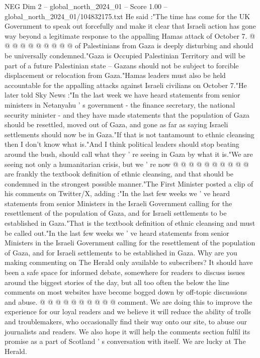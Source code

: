\begin{textsample}{NEG Dim 2 – global\_north\_2024\_01 – Score 1.00 – global\_north\_2024\_01/104832175.txt}
He said :"The time has come for the UK Government to speak out forcefully and make it clear that Israeli action has gone way beyond a legitimate response to the appalling Hamas attack of October 7. @ @ @ @ @ @ @ @ @ @ of Palestinians from Gaza is deeply disturbing and should be universally condemned."Gaza is Occupied Palestinian Territory and will be part of a future Palestinian state -- Gazans should not be subject to forcible displacement or relocation from Gaza."Hamas leaders must also be held accountable for the appalling attacks against Israeli civilians on October 7."He later told Sky News :"In the last week we have heard statements from senior ministers in Netanyahu ' s government - the finance secretary, the national security minister - and they have made statements that the population of Gaza should be resettled, moved out of Gaza, and gone as far as saying Israeli settlements should now be in Gaza."If that is not tantamount to ethnic cleansing then I don't know what is."And I think political leaders should stop beating around the bush, should call what they ' re seeing in Gaza by what it is."We are seeing not only a humanitarian crisis, but we ' re now @ @ @ @ @ @ @ @ @ @ are frankly the textbook definition of ethnic cleansing, and that should be condemned in the strongest possible manner."The First Minister posted a clip of his comments on Twitter/X, adding :"In the last few weeks we ' ve heard statements from senior Ministers in the Israeli Government calling for the resettlement of the population of Gaza, and for Israeli settlements to be established in Gaza."That is the textbook definition of ethnic cleansing and must be called out."In the last few weeks we ' ve heard statements from senior Ministers in the Israeli Government calling for the resettlement of the population of Gaza, and for Israeli settlements to be established in Gaza.
Why are you making commenting on The Herald only available to subscribers?
It should have been a safe space for informed debate, somewhere for readers to discuss issues around the biggest stories of the day, but all too often the below the line comments on most websites have become bogged down by off-topic discussions and abuse. @ @ @ @ @ @ @ @ @ @ comment.
We are doing this to improve the experience for our loyal readers and we believe it will reduce the ability of trolls and troublemakers, who occasionally find their way onto our site, to abuse our journalists and readers.
We also hope it will help the comments section fulfil its promise as a part of Scotland ' s conversation with itself.
We are lucky at The Herald.

\end{textsample}
